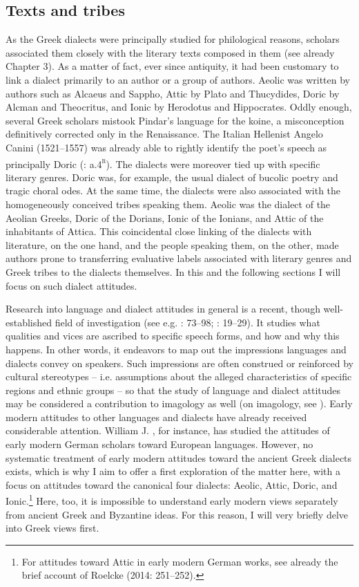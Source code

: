 \documentclass[output=paper]{langsci/langscibook}
\begin{document}
\subsection{Texts and tribes}
\hypertarget{Toc19704850}{}
As the Greek dialects were principally studied for philological reasons, scholars associated them closely with the literary texts composed in them (see already Chapter 3). As a matter of fact, ever since antiquity, it had been customary to link a dialect primarily to an author or a group of authors. Aeolic was written by authors such as Alcaeus and Sappho, Attic by Plato and Thucydides, Doric by Alcman and Theocritus, and Ionic by Herodotus and Hippocrates. Oddly enough, several Greek scholars mistook Pindar’s language for the koine, a misconception definitively corrected only in the Renaissance. The Italian Hellenist Angelo Canini (1521–1557) was already able to rightly identify the poet’s speech as principally Doric (\citealt{Canini1555}: a.4\textsc{\textsuperscript{r}}). The dialects were moreover tied up with specific literary genres. Doric was, for example, the usual dialect of bucolic poetry and tragic choral odes. At the same time, the dialects were also associated with the homogeneously conceived tribes speaking them. Aeolic was the dialect of the Aeolian Greeks, Doric of the Dorians, Ionic of the Ionians, and Attic of the inhabitants of Attica. This coincidental close linking of the dialects with literature, on the one hand, and the people speaking them, on the other, made authors prone to transferring evaluative labels associated with literary genres and Greek tribes to the dialects themselves. In this and the following sections I will focus on such dialect attitudes.

Research into language and dialect attitudes in general is a recent, though well-established field of investigation (see e.g. \citealt{Edwards2009}: 73–98; \citealt{Garrett2010}: 19–29). It studies what qualities and vices are ascribed to specific speech forms, and how and why this happens. In other words, it endeavors to map out the impressions languages and dialects convey on speakers. Such impressions are often construed or reinforced by cultural stereotypes – i.e. assumptions about the alleged characteristics of specific regions and ethnic groups – so that the study of language and dialect attitudes may be considered a contribution to imagology as well (on imagology, see \citealt{BellerLeerssen2007}). Early modern attitudes to other languages and dialects have already received considerable attention. William J. \citet{Jones1999}, for instance, has studied the attitudes of early modern German scholars toward European languages. However, no systematic treatment of early modern attitudes toward the ancient Greek dialects exists, which is why I aim to offer a first exploration of the matter here, with a focus on attitudes toward the canonical four dialects: Aeolic, Attic, Doric, and Ionic.\footnote{For attitudes toward Attic in early modern German works, see already the brief account of Roelcke (2014: 251–252).} Here, too, it is impossible to understand early modern views separately from ancient Greek and Byzantine ideas. For this reason, I will very briefly delve into Greek views first.
\end{document}

